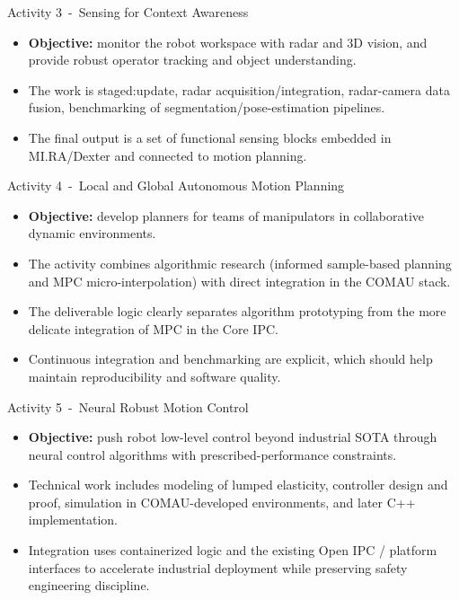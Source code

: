 \documentclass[aspectratio=169,10pt]{beamer}
\begin{document}
\begin{frame}{Activity 3~-~Sensing for Context Awareness}

\small
\begin{itemize}
  \item \textbf{Objective:} monitor the robot workspace with radar and 3D vision, and provide robust operator tracking and object understanding.
  \item The work is staged:\@methodology update, radar acquisition/integration, radar-camera data fusion, benchmarking of segmentation/pose-estimation pipelines.
  \item The final output is a set of functional sensing blocks embedded in MI.RA/Dexter and connected to motion planning.
\end{itemize}

\end{frame}


\begin{frame}{Activity 4~-~Local and Global Autonomous Motion Planning}

\small
\begin{itemize}
  \item \textbf{Objective:} develop planners for teams of manipulators in collaborative dynamic environments.
  \item The activity combines algorithmic research (informed sample-based planning and MPC micro-interpolation) with direct integration in the COMAU stack.
  \item The deliverable logic clearly separates algorithm prototyping from the more delicate integration of MPC in the Core IPC.\@
  \item Continuous integration and benchmarking are explicit, which should help maintain reproducibility and software quality.
\end{itemize}

\end{frame}


\begin{frame}{Activity 5~-~Neural Robust Motion Control}

\small
\begin{itemize}
  \item \textbf{Objective:} push robot low-level control beyond industrial SOTA through neural control algorithms with prescribed-performance constraints.
  \item Technical work includes modeling of lumped elasticity, controller design and proof, simulation in COMAU-developed environments, and later C++ implementation.
  \item Integration uses containerized logic and the existing Open IPC / platform interfaces to accelerate industrial deployment while preserving safety engineering discipline.
\end{itemize}

\end{frame}
\end{document}
